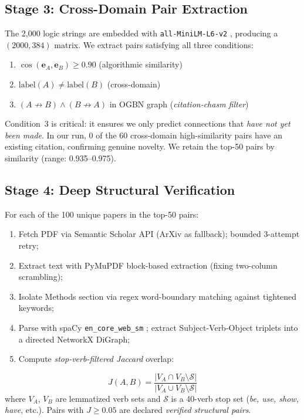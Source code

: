 \documentclass[11pt]{article}
\begin{document}
\subsection{Stage 3: Cross-Domain Pair Extraction}

The 2,000 logic strings are embedded with \texttt{all-MiniLM-L6-v2}
\citep{reimers2019sentence}, producing a $(2000, 384)$ matrix. We extract
pairs satisfying all three conditions:
\begin{enumerate}
\item $\cos(\mathbf{e}_A, \mathbf{e}_B) \geq 0.90$ (algorithmic similarity)
\item $\text{label}(A) \neq \text{label}(B)$ (cross-domain)
\item $(A \not\to B) \wedge (B \not\to A)$ in OGBN graph (\textit{citation-chasm filter})
\end{enumerate}
Condition~3 is critical: it ensures we only predict connections that
\emph{have not yet been made}. In our run, 0 of the 60 cross-domain
high-similarity pairs have an existing citation, confirming genuine novelty.
We retain the top-50 pairs by similarity (range: 0.935--0.975).

\subsection{Stage 4: Deep Structural Verification}

For each of the 100 unique papers in the top-50 pairs:
\begin{enumerate}
\item Fetch PDF via Semantic Scholar API (ArXiv as fallback); bounded 3-attempt retry;
\item Extract text with PyMuPDF block-based extraction (fixing two-column scrambling);
\item Isolate Methods section via regex word-boundary matching against tightened keywords;
\item Parse with spaCy \texttt{en\_core\_web\_sm} \citep{honnibal2020spacy};
  extract Subject-Verb-Object triplets into a directed NetworkX DiGraph;
\item Compute \emph{stop-verb-filtered Jaccard} overlap:
\end{enumerate}
\begin{equation}
J(A,B) = \frac{|V_A \cap V_B \setminus \mathcal{S}|}{|V_A \cup V_B \setminus \mathcal{S}|}
\label{eq:jaccard}
\end{equation}
where $V_A$, $V_B$ are lemmatized verb sets and $\mathcal{S}$ is a 40-verb
stop set (\textit{be, use, show, have}, etc.). Pairs with $J \geq 0.05$ are
declared \emph{verified structural pairs}.
\end{document}

